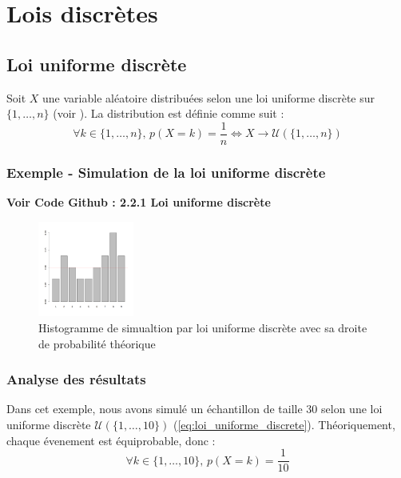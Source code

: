 \section{Lois discrètes}

  \subsection{Loi uniforme discrète}
    Soit $X$ une variable aléatoire distribuées selon une loi uniforme discrète sur $\{1,\ldots,n\}$ (voir \cite{uniformlaw}). La distribution est définie comme suit : 
    \begin{equation}
      \forall k\in \{1,\ldots,n\}, \, p(X=k)=\frac 1n \Leftrightarrow X \rightarrow \mathcal U(\{1,\ldots,n\})
      \label{eq:loi_uniforme_discrete}
    \end{equation}


\subsubsection{Exemple - Simulation de la loi uniforme discrète}

  \textbf{Voir Code Github \cite{git} : 2.2.1 Loi uniforme discrète}

  \begin{figure}[H]
    \centering
    \includegraphics[width=0.28\textwidth]{4_attachments/figures/output3.png}
    \caption{Histogramme de simualtion par loi uniforme discrète avec sa droite de probabilité théorique}
    \label{fig:histogramme_ech}
  \end{figure}

\subsubsection{Analyse des résultats}
  Dans cet exemple, nous avons simulé un échantillon de taille $30$ selon une loi uniforme discrète $\mathcal{U}(\{1,\ldots,10\})$ (\ref{eq:loi_uniforme_discrete}). Théoriquement, chaque évenement est équiprobable, donc :
  \[
    \forall k\in \{1,\ldots,10\}, \, p(X=k)=\frac 1{10}
  \]

